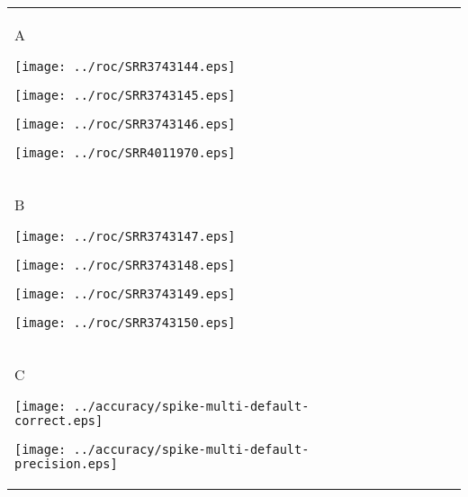 \documentclass{minimal}
\renewcommand\big{\fontsize{10pt}{10pt}\selectfont}
\begin{document}
\begin{tabular}{lllll}

	\begin{minipage}[t][][t]{0.10cm} {\vspace{-2.00cm} \big\textsf{A}} \end{minipage}
	\begin{minipage}[b][][b]{2.11cm} {\centering \texttt{[image: ../roc/SRR3743144.eps]}} \end{minipage} 
	\begin{minipage}[b][][b]{2.11cm} {\centering \texttt{[image: ../roc/SRR3743145.eps]}} \end{minipage}
	\begin{minipage}[b][][b]{2.11cm} {\centering \texttt{[image: ../roc/SRR3743146.eps]}} \end{minipage}
	\begin{minipage}[b][][b]{2.11cm} {\centering \texttt{[image: ../roc/SRR4011970.eps]}} \end{minipage}\\

	\begin{minipage}[t][][t]{0.10cm} {\vspace{-2.00cm} \big\textsf{B}} \end{minipage}
	\begin{minipage}[b][][b]{2.11cm} {\centering \texttt{[image: ../roc/SRR3743147.eps]}} \end{minipage} 
	\begin{minipage}[b][][b]{2.11cm} {\centering \texttt{[image: ../roc/SRR3743148.eps]}} \end{minipage}
	\begin{minipage}[b][][b]{2.11cm} {\centering \texttt{[image: ../roc/SRR3743149.eps]}} \end{minipage}
	\begin{minipage}[b][][b]{2.11cm} {\centering \texttt{[image: ../roc/SRR3743150.eps]}} \end{minipage}\\

	\begin{minipage}[t][][t]{0.20cm} {\vspace{-1.7cm} \big\textsf{C}} \end{minipage}
	\begin{minipage}[b][][b]{1.4cm} {\centering \texttt{[image: ../accuracy/spike-multi-default-correct.eps]}} \end{minipage} 
	\begin{minipage}[b][][b]{1.4cm} {\centering \texttt{[image: ../accuracy/spike-multi-default-precision.eps]}} \end{minipage}


\end{tabular}
\end{document}
